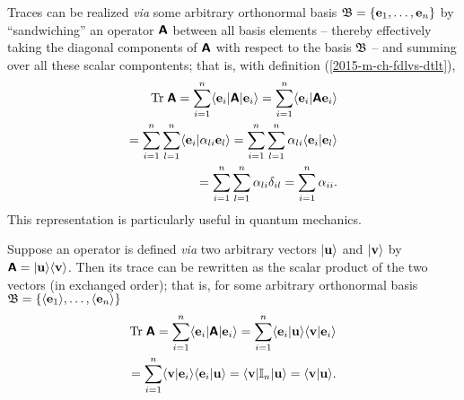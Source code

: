 Traces can be realized {\it via} some arbitrary orthonormal basis ${\frak B} =\{
{\bf e}_1,
\ldots ,
{\bf e}_n
\}$
by ``sandwiching'' an operator $\textsf{\textbf{A}}$ between all basis elements -- thereby effectively taking the diagonal components
of    $\textsf{\textbf{A}}$ with respect to the basis ${\frak B}$ --
and summing over all these scalar compontents; that is, with definition (\ref{2015-m-ch-fdlvs-dtlt}),
\begin{equation}
\begin{split}
\textrm{Tr}\;\textsf{\textbf{A}}
=\sum_{i=1}^n   \langle {\bf e}_i \vert \textsf{\textbf{A}} \vert {\bf e}_i \rangle
=\sum_{i=1}^n   \langle {\bf e}_i \vert \textsf{\textbf{A}}  {\bf e}_i \rangle  \\
=\sum_{i=1}^n  \sum_{l=1}^n  \langle {\bf e}_i \vert \alpha_{li}  {\bf e}_l \rangle
=\sum_{i=1}^n  \sum_{l=1}^n  \alpha_{li} \langle {\bf e}_i \vert  {\bf e}_l \rangle \\
=\sum_{i=1}^n  \sum_{l=1}^n  \alpha_{li} \delta_{il}
=\sum_{i=1}^n   \alpha_{ii}
.
\end{split}
\end{equation}
This representation is particularly useful in quantum mechanics.

Suppose an operator is defined {\em via} two arbitrary vectors
$\vert {\bf u} \rangle$
and
$\vert {\bf v} \rangle$
by
$\textsf{\textbf{A}} =  \vert {\bf u} \rangle \langle {\bf v} \rangle
$.
Then its trace can be rewritten as the scalar product of the two vectors (in exchanged order); that is,
for  some arbitrary orthonormal basis ${\frak B} =\{
 \langle {\bf e}_1\rangle ,
\ldots ,
 \langle {\bf e}_n\rangle
\}$
\begin{equation}
\begin{split}
\textrm{Tr}\;\textsf{\textbf{A}}
=\sum_{i=1}^n   \langle {\bf e}_i \vert \textsf{\textbf{A}} \vert {\bf e}_i \rangle
=\sum_{i=1}^n   \langle {\bf e}_i \vert {\bf u} \rangle \langle {\bf v} \vert   {\bf e}_i \rangle  \\
=\sum_{i=1}^n   \langle {\bf v} \vert   {\bf e}_i \rangle \langle {\bf e}_i \vert {\bf u} \rangle
=   \langle {\bf v} \vert   {\Bbb I}_n \vert {\bf u} \rangle
=   \langle {\bf v} \vert  {\bf u} \rangle
.
\end{split}
\end{equation}

